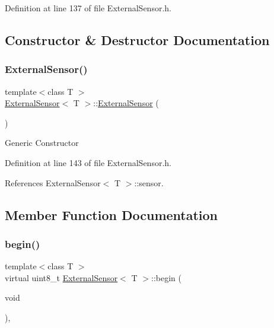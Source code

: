 Definition at line 137 of file External\+Sensor.\+h.



\subsection{Constructor \& Destructor Documentation}
\mbox{\label{class_external_sensor_a8b991447fba33253103d06198b838751}} 
\subsubsection{\texorpdfstring{External\+Sensor()}{ExternalSensor()}}
{\footnotesize\ttfamily template$<$class T $>$ \\
\hyperlink{class_external_sensor}{External\+Sensor}$<$ T $>$\+::\hyperlink{class_external_sensor}{External\+Sensor} (\begin{DoxyParamCaption}{ }\end{DoxyParamCaption})\hspace{0.3cm}{\ttfamily [inline]}}

Generic Constructor 

Definition at line 143 of file External\+Sensor.\+h.



References External\+Sensor$<$ T $>$\+::sensor.



\subsection{Member Function Documentation}
\mbox{\label{class_external_sensor_ab6fe1379d55b656a048e0fba1e0a32e6}} 
\subsubsection{\texorpdfstring{begin()}{begin()}}
{\footnotesize\ttfamily template$<$class T $>$ \\
virtual uint8\+\_\+t \hyperlink{class_external_sensor}{External\+Sensor}$<$ T $>$\+::begin (\begin{DoxyParamCaption}\item[{void}]{ }\end{DoxyParamCaption})\hspace{0.3cm}{\ttfamily [inline]}, {\ttfamily [virtual]}}

